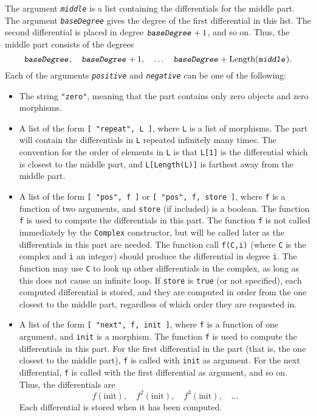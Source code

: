 \documentclass[a4paper,11pt]{report}
\begin{document}
{{{ The argument \mbox{\texttt{\slshape middle}} is a list containing the differentials for the middle part. The argument \mbox{\texttt{\slshape baseDegree}} gives the degree of the first differential in this list. The second
differential is placed in degree $\mbox{\texttt{\slshape baseDegree}}+1$, and so on. Thus, the middle part consists of the degrees 
\[ \mbox{\texttt{\slshape baseDegree}},\quad \mbox{\texttt{\slshape baseDegree}} + 1,\quad \ldots\quad \mbox{\texttt{\slshape baseDegree}} + \text{Length}(\mbox{\texttt{\slshape middle}}). \]
 Each of the arguments \mbox{\texttt{\slshape positive}} and \mbox{\texttt{\slshape negative}} can be one of the following: 
\begin{itemize}
\item The string \texttt{"zero"}, meaning that the part contains only zero objects and zero morphisms.
\item A list of the form \texttt{[ "repeat", L ]}, where \texttt{L} is a list of morphisms. The part will contain the differentials in \texttt{L} repeated infinitely many times. The convention for the order of elements in \texttt{L} is that \texttt{L[1]} is the differential which is closest to the middle part, and \texttt{L[Length(L)]} is farthest away from the middle part.
\item A list of the form \texttt{[ "pos", f ]} or \texttt{[ "pos", f, store ]}, where \texttt{f} is a function of two arguments, and \texttt{store} (if included) is a boolean. The function \texttt{f} is used to compute the differentials in this part. The function \texttt{f} is not called immediately by the \texttt{Complex} constructor, but will be called later as the differentials in this part are
needed. The function call \texttt{f(C,i)} (where \texttt{C} is the complex and \texttt{i} an integer) should produce the differential in degree \texttt{i}. The function may use \texttt{C} to look up other differentials in the complex, as long as this does not cause
an infinite loop. If \texttt{store} is \texttt{true} (or not specified), each computed differential is stored, and they are
computed in order from the one closest to the middle part, regardless of which
order they are requested in.
\item A list of the form \texttt{[ "next", f, init ]}, where \texttt{f} is a function of one argument, and \texttt{init} is a morphism. The function \texttt{f} is used to compute the differentials in this part. For the first differential
in the part (that is, the one closest to the middle part), \texttt{f} is called with \texttt{init} as argument. For the next differential, \texttt{f} is called with the first differential as argument, and so on. Thus, the
differentials are 
\[ f(\text{init}),\quad f^2(\text{init}),\quad f^3(\text{init}),\quad \ldots \]
 Each differential is stored when it has been computed. 
\end{itemize}
 }

}}
\end{document}
